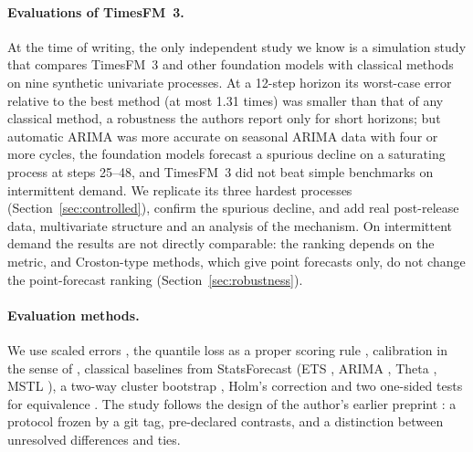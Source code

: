 \paragraph{Evaluations of TimesFM~3.} At the time of writing, the only independent study we know is a simulation study
\citep{ebrahim2026foundation} that compares TimesFM~3 and other foundation models with classical methods on nine synthetic univariate processes. At a
12-step horizon its worst-case error relative to the best method (at most 1.31 times) was smaller than that of any classical
method, a robustness the authors report only for short horizons; but automatic ARIMA was more accurate
on seasonal ARIMA data with four or more cycles, the foundation models forecast a spurious decline on a saturating process at
steps 25--48, and TimesFM~3 did not beat simple benchmarks on intermittent demand. We replicate its three hardest processes
(Section~\ref{sec:controlled}), confirm the spurious decline, and add real post-release data, multivariate structure and an
analysis of the mechanism. On intermittent demand the results are not directly comparable: the ranking depends on the metric, and Croston-type methods, which give point forecasts only, do not
change the point-forecast ranking (Section~\ref{sec:robustness}).

\paragraph{Evaluation methods.} We use scaled errors \citep{hyndman2006mase}, the quantile loss as a proper scoring rule
\citep{gneiting2007scoring}, calibration in the sense of \citet{gneiting2007calibration}, classical baselines from StatsForecast
\citep{garza2022statsforecast} (ETS \citep{hyndman2002state}, ARIMA \citep{hyndman2008forecast}, Theta
\citep{assimakopoulos2000theta}, MSTL \citep{bandara2025mstl}), a two-way cluster bootstrap \citep{cameron2011multiway,davison1997bootstrap},
Holm's correction \citep{holm1979} and two one-sided tests for equivalence \citep{schuirmann1987tost}. The study follows the design of the author's earlier preprint \citep{pomaro2026decision}: a protocol frozen by
a git tag, pre-declared contrasts, and a distinction between unresolved differences and ties.
